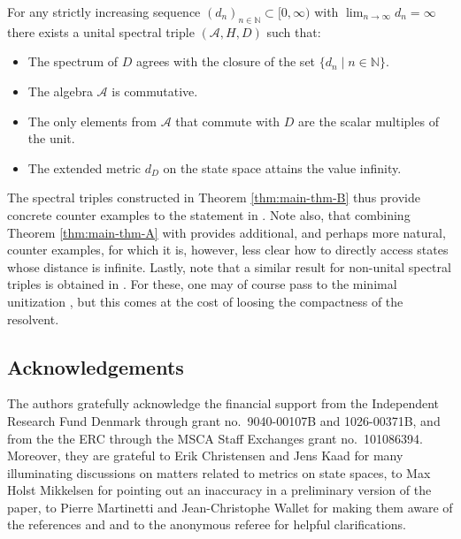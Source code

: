 \documentclass[12pt,a4paper,twoside,reqno]{amsart}
\theoremstyle{plain}
\theoremstyle{definition}
\theoremstyle{remark} %
\theoremstyle{plain}
\numberwithin{equation}{section}
\newcommand{\A}{{\mathcal{A}}}
\newcommand{\NN}{{\mathbb{N}}}
\begin{document}
 \begin{theoremletter}\label{thm:main-thm-B}
 For any strictly increasing  sequence $(d_n)_{n\in \NN}\subset  [0,\infty)$ with  $\lim_{n\to \infty} d_n=\infty$ there exists a unital spectral triple $(\A, H, D)$ such that: 
\begin{itemize}
\item[(a)] The spectrum of $D$ agrees with the closure of the set $\{d_n \mid n\in \NN \}$.
\item[(b)] The algebra $\A$ is commutative.
\item[(c)] The only elements from $\A$ that commute with $D$ are the scalar multiples of the unit.
\item[(d)] The extended metric $d_D$ on the state space attains the value infinity. 
\end{itemize}
\end{theoremletter}
The  spectral triples constructed in Theorem \ref{thm:main-thm-B} thus  provide concrete counter examples to the statement in \cite[Proposition B.1]{Rennie-Varilly}. 
Note also, that combining Theorem \ref{thm:main-thm-A} with \cite[Theorem 5.4 \& 5.5]{PutJul:subshifts} provides additional, and perhaps more natural, counter examples, for which  it is, however,  less clear how to directly access states whose distance is infinite.
Lastly, note that  a similar result for  non-unital  spectral triples is obtained in \cite[Proposition 3.10]{CAM-Moyal}. For these, 
one may of course pass to the minimal unitization \cite[Lemma 5.4]{MT13}, but this comes at the cost of loosing the compactness of the resolvent. 




\subsection*{Acknowledgements}
The authors gratefully acknowledge the financial support from  the Independent Research Fund Denmark through grant no.~9040-00107B and 1026-00371B, and from the the ERC through the MSCA Staff Exchanges grant no.~101086394.
Moreover, they are grateful to Erik Christensen and Jens Kaad for many illuminating discussions on  matters related to metrics on state spaces, to Max Holst Mikkelsen for pointing out an inaccuracy in a preliminary version of the paper, to Pierre Martinetti and Jean-Christophe Wallet for making them aware of the references  \cite{CAM-Moyal} and \cite{MT13} and to the anonymous referee for helpful clarifications. 
\end{document}
